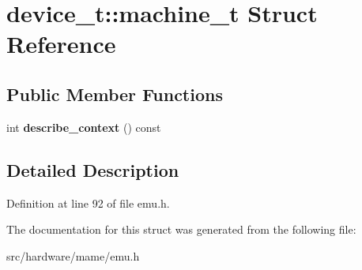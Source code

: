 \hypertarget{structdevice__t_1_1machine__t}{\section{device\-\_\-t\-:\-:machine\-\_\-t Struct Reference}
\label{structdevice__t_1_1machine__t}
}
\subsection*{Public Member Functions}
\begin{DoxyCompactItemize}
\item 
\hypertarget{structdevice__t_1_1machine__t_a138ab4d9d326c42b2dfb7042c218b8ab}{int {\bfseries describe\-\_\-context} () const }\label{structdevice__t_1_1machine__t_a138ab4d9d326c42b2dfb7042c218b8ab}

\end{DoxyCompactItemize}


\subsection{Detailed Description}


Definition at line 92 of file emu.\-h.



The documentation for this struct was generated from the following file\-:\begin{DoxyCompactItemize}
\item 
src/hardware/mame/emu.\-h\end{DoxyCompactItemize}
